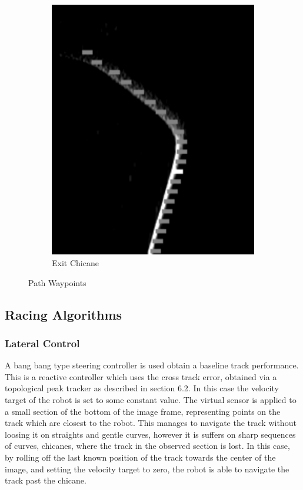 \begin{figure}[H]
\begin{subfigure}[b]{0.32\textwidth}
                 \includegraphics[width=\textwidth,height=0.2\textheight]{visionpipeline/apprachLeft.png}
                 \caption{Exit Chicane}
                 \label{fig:exitChicane}
              \end{subfigure}
              \caption{Path Waypoints}
              \label{fig:PathWayPoints}
           \end{figure}

        \subsection{Racing Algorithms}
            \subsubsection{Lateral Control}
            A bang bang type steering controller is used obtain a baseline track performance. 
            This is a reactive controller which uses the cross track error, obtained via a topological peak tracker as described in section 6.2.
            In this case the velocity target of the robot is set to some constant value. 
            The virtual sensor is applied to a small section of the bottom of the image frame, representing points on the track which are closest to the robot. 
            This manages to navigate the track without loosing it on straights and gentle curves, however it is suffers on
            sharp sequences of curves, chicanes, where the track in the observed section is lost. In this case, by rolling off the last known position 
            of the track towards the center of the image, and setting the velocity target to zero, the robot is able to navigate the track past the chicane.
            
